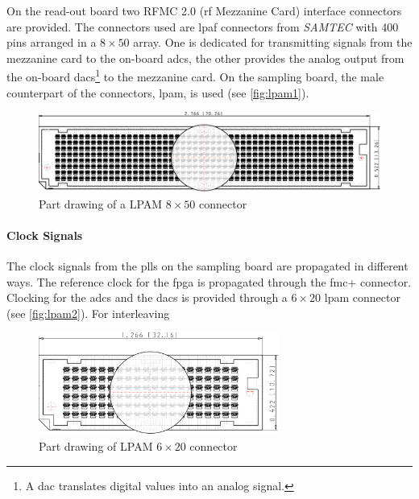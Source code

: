 On the read-out board two RFMC 2.0 (\gls{rf} Mezzanine Card) interface connectors are provided.
The connectors used are \gls{lpaf} connectors from \textit{SAMTEC} with 400 pins arranged in a $8\times50$ array.
One is dedicated for transmitting signals from the mezzanine card to the on-board \glspl{adc}, the other provides the analog output from the on-board \glspl{dac}\footnote{A \gls{dac} translates digital values into an analog signal.} to the mezzanine card.
On the sampling board, the male counterpart of the connectors, \gls{lpam}, is used (see \autoref{fig:lpam1}).

\begin{figure}[tbh]
	\centering
	\includegraphics[width = \textwidth]{chap/04-work/img/lpam_50_top.pdf}
	\caption[LPAM $8\times50$ connector]{Part drawing of a LPAM $8\times50$ connector}
	\label{fig:lpam1}
\end{figure}


\paragraph{Clock Signals}
The clock signals from the \glspl{pll} on the sampling board are propagated in different ways.
The reference clock for the \gls{fpga} is propagated through the \gls{fmc}+ connector.
Clocking for the \glspl{adc} and the \glspl{dac} is provided through a $6\times20$ \gls{lpam} connector (see \autoref{fig:lpam2}). For interleaving %


\begin{figure}[tbh]
	\centering
	\includegraphics[width = 0.7\textwidth]{chap/04-work/img/lpam_20.pdf}
	\caption[LPAM $6\times20$ connector]{Part drawing of LPAM $6\times20$ connector}
	\label{fig:lpam2}
\end{figure}

